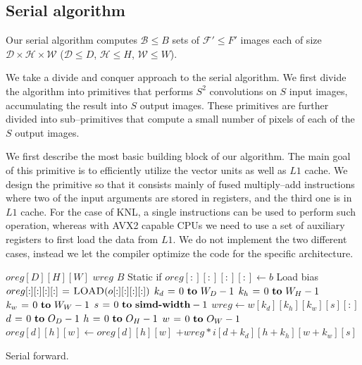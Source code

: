   \subsection{Serial algorithm}

  Our serial algorithm computes $\mathcal{B} \le B$ sets of
  $\mathcal{F}' \le F'$ images each of size $\mathcal{D} \times
  \mathcal{H} \times \mathcal{W}$ ($\mathcal{D} \le D$, $\mathcal{H}
  \le H$, $\mathcal{W} \le W$).

  We take a divide and conquer approach to the serial algorithm.  We
  first divide the algorithm into primitives that performs $S^2$
  convolutions on $S$ input images, accumulating the result into $S$
  output images.  These primitives are further divided into
  sub--primitives that compute a small number of pixels of each of the
  $S$ output images.

  We first describe the most basic building block of our algorithm.
  The main goal of this primitive is to efficiently utilize the vector
  units as well as $L1$ cache.  We design the primitive so that it
  consists mainly of fused multiply--add instructions where two of the
  input arguments are stored in registers, and the third one is in
  $L1$ cache.  For the case of KNL, a single instructions can be used
  to perform such operation, whereas with AVX2 capable CPUs we need to
  use a set of auxiliary registers to first load the data from $L1$.
  We do not implement the two different cases, instead we let the
  compiler optimize the code for the specific architecture.

  \begin{algorithm}
    {\footnotesize
      \begin{codebox}
        \li {} $oreg[D][H][W]$
        \li {} $wreg$
        \li \If $B$ \Comment Static if
        \li \Then $oreg[:][:][:][:] \gets b$ \Comment Load bias
        \li \Else
        \li       $oreg[:][:][:][:] \mathrel{\hspace{1pt}=\hspace{1pt}} \textnormal{\scshape LOAD}(o[:][:][:][:])$
        \End \li {}
        \li {} $k_d \gets 0 \To W_D-1$
        \li   \Do {} $k_h \gets 0 \To W_H-1$
        \li      \Do {} $k_w \gets 0 \To W_W-1$
        \li         \Do {} $s \gets 0 \To \kw{simd-width} - 1$
        \li         \Do $wreg \gets w[k_d][k_h][k_w][s][:]$
        \li {} $d \gets 0 \To O_D-1$
        \li   \Do {} $h \gets 0 \To O_H-1$
        \li      \Do {} $w \gets 0 \To O_W-1$
        \li         \Do $oreg[d][h][w] \gets oreg[d][h][w]$
        \li             $+ wreg * i[d+k_d][h+k_h][w+k_w][s]$
        \End \End \End
        \End \End \End \End
      \end{codebox}
    \caption{Serial forward.}
    \label{alg:serial-forward-subtask}
    }
  \end{algorithm}

